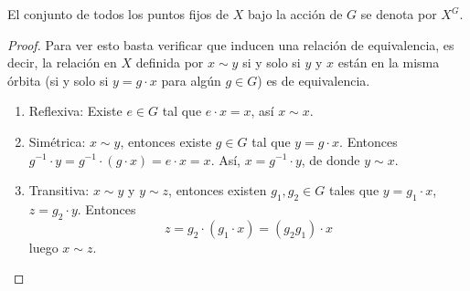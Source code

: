\begin{nota}
    El conjunto de todos los puntos fijos de $X$ bajo la acción de $G$ se denota por $X^G$.
\end{nota}

\begin{proof}
    Para ver esto basta verificar que inducen una relación de equivalencia, es decir, la relación en $X$ definida por $x \sim y$ si y solo si $y$ y $x$ están en la misma órbita (si y solo si $y = g \cdot x$ para algún $g \in G$) es de equivalencia.
    \begin{enumerate}
        \item Reflexiva: Existe $e \in G$ tal que $e \cdot x = x$, así $x \sim x$.
        \item Simétrica: $x \sim y$, entonces existe $g \in G$ tal que $y = g \cdot x$. Entonces $g^{-1} \cdot y = g^{-1} \cdot (g \cdot x) = e \cdot x = x$.
        Así, $x = g^{-1} \cdot y$, de donde $y \sim x$.
        \item Transitiva: $x \sim y$ y $y \sim z$, entonces existen $g_1, g_2 \in G$ tales que $y = g_1 \cdot x$, $z = g_2 \cdot y$. Entonces
        \begin{equation*}
            z = g_2 \cdot (g_1 \cdot x) = (g_2 g_1) \cdot x
        \end{equation*}
        luego $x \sim z$.
    \end{enumerate}

    \begin{center}
\end{center}
\end{proof}
